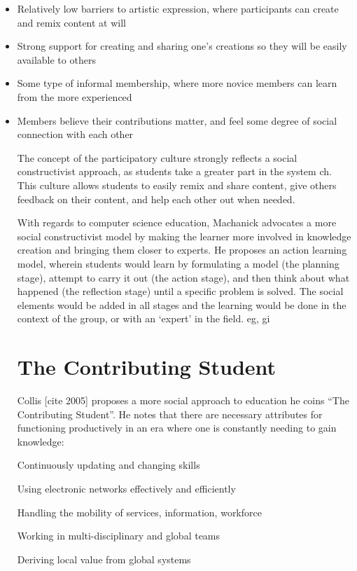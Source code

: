 \begin{itemize}
\item Relatively low barriers to artistic expression, where participants can create and remix content at will
\item Strong support for creating and sharing one’s creations so they will be easily available to others
\item Some type of informal membership, where more novice members can learn from the more experienced
\item Members believe their contributions matter, and feel some degree of social connection with each other

The concept of the participatory culture strongly reflects a social constructivist approach, as students take a greater part in the system {ch}. This culture allows students to easily remix and share content, give others feedback on their content, and help each other out when needed.

With regards to computer science education, Machanick \cite{machanick2007social} advocates a more social constructivist model by making the learner more involved in knowledge creation and bringing them closer to experts. He proposes an action learning model, wherein students would learn by formulating a model (the planning stage), attempt to carry it out (the action stage), and then think about what happened (the reflection stage) until a specific problem is solved. The social elements would be added in all stages and the learning would be done in the context of the group, or with an ‘expert’ in the field. {eg, gi}

\section{The Contributing Student}
Collis [cite 2005] proposes a more social approach to education he coins “The Contributing Student”. He notes that there are necessary attributes for functioning productively in an era where one is constantly needing to gain knowledge:

Continuously updating and changing skills

Using electronic networks effectively and efficiently

Handling the mobility of services, information, workforce

Working in multi-disciplinary and global teams

Deriving local value from global systems


\end{itemize}
